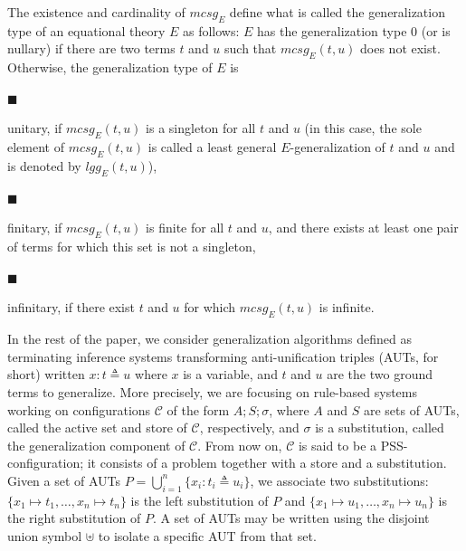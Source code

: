  
The existence and cardinality of $\mathit{mcsg}_{E}$ define what is called the generalization type of an equational theory $E$ as follows: $E$ has the generalization type 0 (or is nullary) if there are two terms $t$ and $u$ such that $\mathit{mcsg}_{E}(t,u)$ does not exist. Otherwise, the generalization type of $E$ is\par
  
\par\noindent  $\blacksquare$ 
 
unitary, if $\mathit{mcsg}_{E}(t,u)$ is a singleton for all $t$ and $u$ (in this case, the sole element of $\mathit{mcsg}_{E}(t,u)$ is called a least general $E$-generalization of $t$ and $u$ and is denoted by $\mathit{lgg}_{E}(t,u)$),\par
 
 
 
\par\noindent  $\blacksquare$ 
 
finitary, if $\mathit{mcsg}_{E}(t,u)$ is finite for all $t$ and $u$, and there exists at least one pair of terms for which this set is not a singleton,\par
 
 
 
\par\noindent  $\blacksquare$ 
 
infinitary, if there exist $t$ and $u$ for which $\mathit{mcsg}_{E}(t,u)$ is infinite.\par
 
 
  
 
 
In the rest of the paper, we consider generalization algorithms defined as terminating inference systems transforming anti-unification triples (AUTs, for short) written $x:t\triangleq u$ where $x$ is a variable, and $t$ and $u$ are the two ground terms to generalize. More precisely, we are focusing on rule-based systems working on configurations $\mathcal{C}$ of the form $A;S;\sigma$, where $A$ and $S$ are sets of AUTs, called the active set and store of $\mathcal{C}$, respectively, and $\sigma$ is a substitution, called the generalization component of $\mathcal{C}$. From now on, $\mathcal{C}$ is said to be a PSS-configuration; it consists of a problem together with a store and a substitution. Given a set of AUTs $P=\bigcup_{i=1}^{n}\{x_{i}:t_{i}\triangleq u_{i}\}$, we associate two substitutions: $\{x_{1}\mapsto t_{1},\allowbreak\dots,x_{n}\mapsto t_{n}\}$ is the left substitution of $P$ and $\{x_{1}\mapsto u_{1},\dots,x_{n}\mapsto u_{n}\}$ is the right substitution of $P$. A set of AUTs may be written using the disjoint union symbol $\uplus$ to isolate a specific AUT from that set.\par
 
